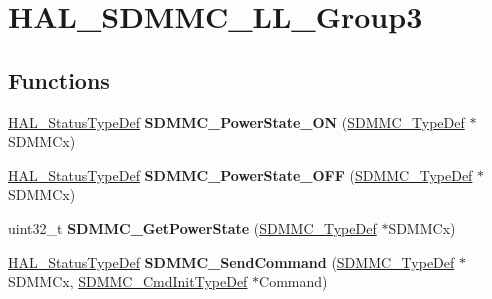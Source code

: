 \hypertarget{group___h_a_l___s_d_m_m_c___l_l___group3}{}\section{H\+A\+L\+\_\+\+S\+D\+M\+M\+C\+\_\+\+L\+L\+\_\+\+Group3}
\label{group___h_a_l___s_d_m_m_c___l_l___group3}
\subsection*{Functions}
\begin{DoxyCompactItemize}
\item 
\mbox{\label{group___h_a_l___s_d_m_m_c___l_l___group3_ga00a459dd86b5346f9964ad709b61ba8f}} 
\mbox{\hyperlink{stm32f7xx__hal__def_8h_a63c0679d1cb8b8c684fbb0632743478f}{H\+A\+L\+\_\+\+Status\+Type\+Def}} {\bfseries S\+D\+M\+M\+C\+\_\+\+Power\+State\+\_\+\+ON} (\mbox{\hyperlink{struct_s_d_m_m_c___type_def}{S\+D\+M\+M\+C\+\_\+\+Type\+Def}} $\ast$S\+D\+M\+M\+Cx)
\item 
\mbox{\label{group___h_a_l___s_d_m_m_c___l_l___group3_ga7ff68265c1ad219edaeaa22a4a85c8ca}} 
\mbox{\hyperlink{stm32f7xx__hal__def_8h_a63c0679d1cb8b8c684fbb0632743478f}{H\+A\+L\+\_\+\+Status\+Type\+Def}} {\bfseries S\+D\+M\+M\+C\+\_\+\+Power\+State\+\_\+\+O\+FF} (\mbox{\hyperlink{struct_s_d_m_m_c___type_def}{S\+D\+M\+M\+C\+\_\+\+Type\+Def}} $\ast$S\+D\+M\+M\+Cx)
\item 
\mbox{\label{group___h_a_l___s_d_m_m_c___l_l___group3_ga9a09da50135539cad415331b3185a182}} 
uint32\+\_\+t {\bfseries S\+D\+M\+M\+C\+\_\+\+Get\+Power\+State} (\mbox{\hyperlink{struct_s_d_m_m_c___type_def}{S\+D\+M\+M\+C\+\_\+\+Type\+Def}} $\ast$S\+D\+M\+M\+Cx)
\item 
\mbox{\label{group___h_a_l___s_d_m_m_c___l_l___group3_ga25b6828b2976bd7d86b384fd5d6d81d8}} 
\mbox{\hyperlink{stm32f7xx__hal__def_8h_a63c0679d1cb8b8c684fbb0632743478f}{H\+A\+L\+\_\+\+Status\+Type\+Def}} {\bfseries S\+D\+M\+M\+C\+\_\+\+Send\+Command} (\mbox{\hyperlink{struct_s_d_m_m_c___type_def}{S\+D\+M\+M\+C\+\_\+\+Type\+Def}} $\ast$S\+D\+M\+M\+Cx, \mbox{\hyperlink{struct_s_d_m_m_c___cmd_init_type_def}{S\+D\+M\+M\+C\+\_\+\+Cmd\+Init\+Type\+Def}} $\ast$Command)

\end{DoxyCompactItemize}
